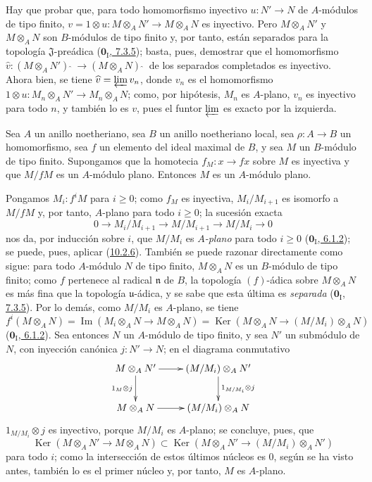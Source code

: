 Hay que probar que, para todo homomorfismo inyectivo $u:N'\to N$ de $A$-módulos de tipo finito, $v=1\otimes u:M\otimes_A N'\to M\otimes_A N$ es inyectivo.
Pero $M\otimes_A N'$ y $M\otimes_A N$ son $B$-módulos de tipo finito y, por tanto, están separados para la topología $\mathfrak{J}$-preádica (\hyperref[0.7.3.5-fr]{$\mathbf{0}_{\mathrm I}$, 7.3.5}); basta, pues, demostrar que el homomorfismo $\widehat v:(M\otimes_A N'){\,\widehat{\,}\,}\to(M\otimes_A N){\,\widehat{\,}\,}$ de los separados completados es inyectivo. Ahora bien, se tiene $\widehat v=\varprojlim v_n$, donde $v_n$ es el homomorfismo $1\otimes u:M_n\otimes_A N'\to M_n\otimes_A N$;
como, por hipótesis, $M_n$ es $A$-plano, $v_n$ es inyectivo para todo $n$, y también lo es $v$, pues el funtor $\varprojlim$ es exacto por la izquierda.


\begin{corollary}[10.2.7]
\label{0.10.2.7}
\label{0.10.2.7-fr}
Sea $A$ un anillo noetheriano, sea $B$ un anillo noetheriano local, sea $\rho:A\to B$ un homomorfismo, sea $f$ un elemento del ideal maximal de $B$, y sea $M$ un $B$-módulo de tipo finito.
Supongamos que la homotecia $f_M:x\to fx$ sobre $M$ es inyectiva y que $M/fM$ es un $A$-módulo plano.
Entonces $M$ es un $A$-módulo plano.
\end{corollary}

Pongamos $M_i:f^iM$ para $i\geq0$;
como $f_M$ es inyectiva, $M_i/M_{i+1}$ es isomorfo a $M/fM$ y, por tanto, $A$-plano para todo $i\geq0$;
la sucesión exacta
\[
  0\longrightarrow M_i/M_{i+1}\longrightarrow M/M_{i+1}
  \longrightarrow M/M_i\longrightarrow0
\]
nos da, por inducción sobre $i$, que $M/M_i$ es \emph{$A$-plano} para todo $i\geq0$ (\hyperref[0.6.1.2-fr]{$\mathbf{0}_{\mathrm I}$, 6.1.2}); se puede, pues, aplicar (\hyperref[0.10.2.6-fr]{10.2.6}). También se puede razonar directamente como sigue: para todo $A$-módulo $N$ de tipo finito, $M\otimes_A N$ es un $B$-módulo de tipo finito;
como $f$ pertenece al radical $\mathfrak n$ de $B$, la topología $(f)$-ádica sobre $M\otimes_A N$ es más fina que la
topología $\mathfrak u$-ádica, y se sabe que esta última es \emph{separada}
(\hyperref[0.7.3.5-fr]{$\mathbf{0}_{\mathrm I}$, 7.3.5}). Por lo demás, como $M/M_i$ es $A$-plano, se tiene
\[
  f^i(M\otimes_A N)=\operatorname{Im}(M_i\otimes_A N\to M\otimes_A N)
  =\operatorname{Ker}(M\otimes_A N\to(M/M_i)\otimes_A N)
\]
(\hyperref[0.6.1.2-fr]{$\mathbf{0}_{\mathrm I}$, 6.1.2}). Sea entonces $N$ un $A$-módulo de tipo finito, y sea $N'$ un submódulo de $N$, con inyección canónica $j:N'\to N$; en el diagrama conmutativo
\[
\xymatrix{
  M\otimes_A N'\ar[r]\ar[d]_{1_M\otimes j} &
  (M/M_i)\otimes_A N'\ar[d]^{1_{M/M_i}\otimes j}\\
  M\otimes_A N\ar[r] & (M/M_i)\otimes_A N
}
\]
$1_{M/M_i}\otimes j$ es inyectivo, porque $M/M_i$ es $A$-plano; se concluye, pues, que
\[
  \operatorname{Ker}(M\otimes_A N'\to M\otimes_A N)
  \subset\operatorname{Ker}(M\otimes_A N'\to(M/M_i)\otimes_A N')
\]
para todo $i$; como la intersección de estos últimos núcleos es $0$, según se ha visto antes, también lo es el primer núcleo y, por tanto, $M$ es $A$-plano.


